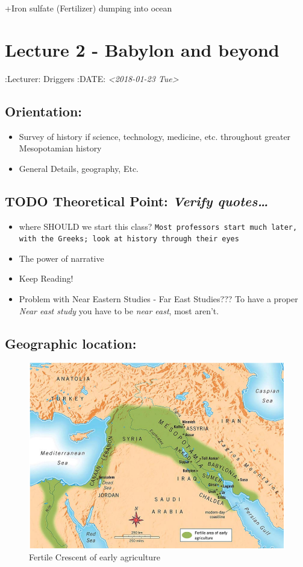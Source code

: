 \documentclass[11pt]{article}
\begin{document}
+Iron sulfate (Fertilizer) dumping into ocean

\section{Lecture 2 - Babylon and beyond}
\label{sec-3}
:Lecturer: Driggers
:DATE: \textit{<2018-01-23 Tue>}

\subsection{Orientation:}
\label{sec-3-1}
\begin{itemize}
\item Survey of history if science, technology, medicine, etc. throughout greater Mesopotamian history
\item General Details, geography, Etc.
\end{itemize}

\subsection{{\bfseries\sffamily TODO} Theoretical Point: \emph{Verify quotes\ldots{}}}
\label{sec-3-2}
\begin{itemize}
\item where SHOULD we start this class?
\texttt{Most professors start much later, with the Greeks; look at history through their eyes}

\item The power of narrative

\item Keep Reading!

\item Problem with Near Eastern Studies - Far East Studies???
To have a proper \emph{Near east study} you have to be \emph{near east}, most aren't.
\end{itemize}

\subsection{Geographic location:}
\label{sec-3-3}
\begin{figure}[htb]
\centering
\includegraphics[width=.9\linewidth]{./img/fertileCrescent.png}
\caption{Fertile Crescent of early agriculture}
\end{figure}
\end{document}
